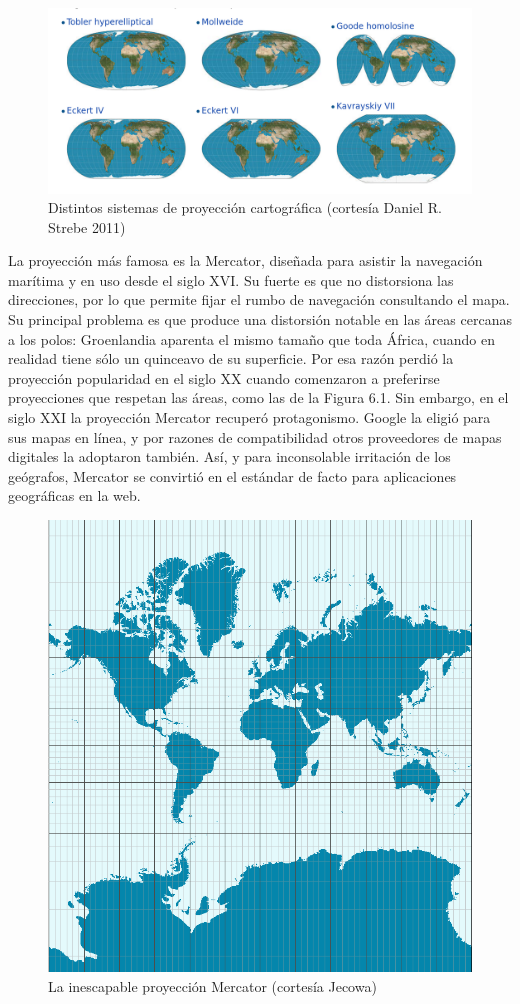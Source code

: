 \documentclass[]{book}
\begin{document}
\begin{figure}
\includegraphics[width=9.49in]{imagenes/proyecciones} \caption{Distintos sistemas de proyección cartográfica (cortesía Daniel R. Strebe 2011)}\label{fig:unnamed-chunk-142}
\end{figure}

La proyección más famosa es la Mercator, diseñada para asistir la
navegación marítima y en uso desde el siglo XVI. Su fuerte es que no
distorsiona las direcciones, por lo que permite fijar el rumbo de
navegación consultando el mapa. Su principal problema es que produce una
distorsión notable en las áreas cercanas a los polos: Groenlandia
aparenta el mismo tamaño que toda África, cuando en realidad tiene sólo
un quinceavo de su superficie. Por esa razón perdió la proyección
popularidad en el siglo XX cuando comenzaron a preferirse proyecciones
que respetan las áreas, como las de la Figura 6.1. Sin embargo, en el
siglo XXI la proyección Mercator recuperó protagonismo. Google la eligió
para sus mapas en línea, y por razones de compatibilidad otros
proveedores de mapas digitales la adoptaron también. Así, y para
inconsolable irritación de los geógrafos, Mercator se convirtió en el
estándar de facto para aplicaciones geográficas en la web.

\begin{figure}
\includegraphics[width=4.53in]{imagenes/Mercator-proj} \caption{La inescapable proyección Mercator (cortesía Jecowa)}\label{fig:unnamed-chunk-143}
\end{figure}
\end{document}
